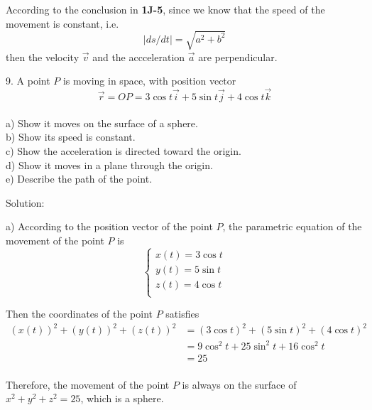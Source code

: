 \documentclass{article}
\begin{document}
According to the conclusion in \textbf{1J-5}, since we know that the speed of 
the movement is constant, i.e.
\begin{equation*}
  |ds/dt| = \sqrt{a^2 + b^2}
\end{equation*}
then the velocity $\vec{v}$ and the accceleration $\vec{a}$ are perpendicular.

\bigskip

9. A point $P$ is moving in space, with position vector
\begin{equation*}
  \vec{r} = OP = 3 \cos t \vec{i} + 5 \sin t \vec{j} + 4 \cos t \vec{k}
\end{equation*} \\
a) Show it moves on the surface of a sphere. \\
b) Show its speed is constant. \\
c) Show the acceleration is directed toward the origin. \\
d) Show it moves in a plane through the origin. \\
e) Describe the path of the point.

Solution:

a) According to the position vector of the point $P$, the parametric equation of 
the movement of the point $P$ is
\begin{equation*}
  \begin{cases}
    x(t) = 3 \cos t \\
    y(t) = 5 \sin t \\
    z(t) = 4 \cos t \\
  \end{cases}
\end{equation*}

Then the coordinates of the point $P$ satisfies
\begin{equation*}
  \begin{split}
    (x(t))^2 + (y(t))^2 + (z(t))^2 &= (3 \cos t)^2 + (5 \sin t)^2 + (4 \cos t)^2 \\
                                   &= 9 \cos^2 t + 25 \sin^2 t + 16 \cos^2 t \\
                                   &= 25 \\
  \end{split}
\end{equation*}

Therefore, the movement of the point $P$ is always on the surface of 
$x^2 + y^2 + z^2 = 25$, which is a sphere.
\end{document}

